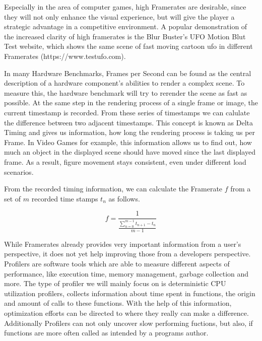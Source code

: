Especially in the area of computer games, high Framerates are desirable, since
they will not only enhance the visual experience, but will give the player a
strategic advantage in a competitive environment.  A popular demonstration of
the increased clarity of high framerates is the Blur Buster's UFO Motion Blut
Test website, which shows the same scene of fast moving cartoon ufo in different
Framerates (https://www.testufo.com).

In many Hardware Benchmarks, Frames per Second can be found as the central
description of a hardware component's abilities to render a complex scene. To
measure this, the hardware benchmark will try to rerender the scene as fast as
possible. At the same step in the rendering process of a single frame or image,
the current timestamp is recorded. From these series of timestamps we can
calulate the difference between two adjacent timestamps. This concept is known
as Delta Timing and gives us information, how long the rendering process is
taking us per Frame. In Video Games for example, this information allows us to
find out, how much an object in the displayed scene should have moved since the
last displayed frame. As a result, figure movement stays consistent, even under
different load scenarios.

From the recorded timing information, we can calculate the Framerate $f$ from a
set of $m$ recorded time stamps $t_n$ as follows.

$$f = \frac{1}{\frac{ \sum_{n=0}^{m-1} t_{n+1} - t_{n} }{ m - 1 }}$$


While Framerates already provides very important information from a user's
perspective, it does not yet help improving those from a developers perspective.
Profilers are software tools which are able to measure different aspects of
performance, like execution time, memory management, garbage collection and
more. The type of profiler we will mainly focus on is deterministic CPU
utilization profilers, collects information about time spent in functions, the
origin and amount of calls to these functions. With the help of this
information, optimization efforts can be directed to where they really can make
a difference. Additionally Profilers can not only uncover slow performing
fuctions, but also, if functions are more often called as intended by a programs
author.

